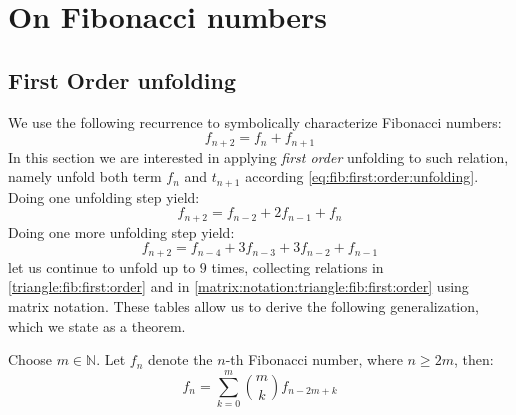 
\chapter{On Fibonacci numbers}

\section{First Order unfolding}

We use the following recurrence to symbolically characterize Fibonacci numbers: 
\begin{equation}
    \label{eq:fib:first:order:unfolding}
    f_{n + 2} = f_{n} + f_{n + 1}
\end{equation}
In this section we are interested in applying \emph{first order} unfolding
to such relation, namely unfold both term $f_{n}$ and $t_{n+1}$ according
\autoref{eq:fib:first:order:unfolding}. Doing one unfolding step yield:
\begin{displaymath} 
    f_{n + 2} = f_{n - 2} + 2 f_{n - 1} + f_{n}
\end{displaymath}
Doing one more unfolding step yield:
\begin{displaymath} 
    f_{n + 2} = f_{n - 4} + 3 f_{n - 3} + 3 f_{n - 2} + f_{n - 1}
\end{displaymath}
let us continue to unfold up to $9$ times, collecting relations in 
\autoref{triangle:fib:first:order} and in \autoref{matrix:notation:triangle:fib:first:order}
using matrix notation. These tables allow us to derive the 
following generalization, which we state as a theorem.

\begin{thm} 
    Choose $m\in\mathbb{N}$. Let $f_{n}$ denote the $n$-th Fibonacci number,
    where $n \geq 2m$, then:
    \begin{displaymath} 
        f_{n} = \sum_{k=0}^{m} {{{m}\choose{k}} f_{n - 2 m + k}}
    \end{displaymath} 
\end{thm}



